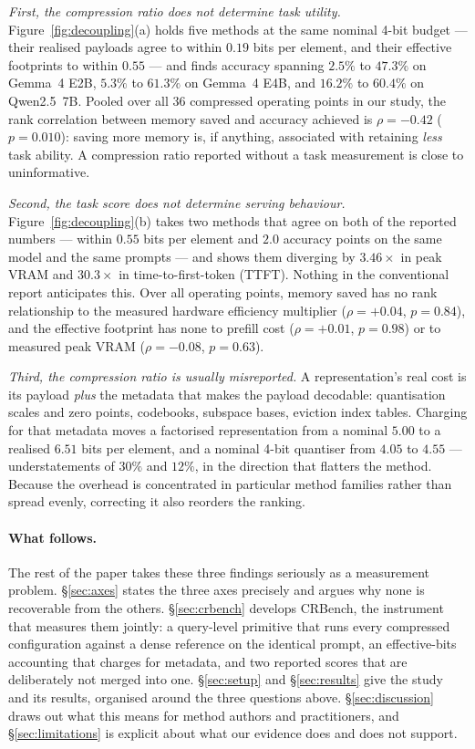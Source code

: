 \documentclass{article}
\theoremstyle{definition}
\begin{document}
\emph{First, the compression ratio does not determine task utility.} Figure~\ref{fig:decoupling}(a) holds five methods at the same nominal 4-bit budget --- their realised payloads agree to within $0.19$ bits per element, and their effective footprints to within $0.55$ --- and finds accuracy spanning $2.5\%$ to $47.3\%$ on Gemma~4 E2B, $5.3\%$ to $61.3\%$ on Gemma~4 E4B, and $16.2\%$ to $60.4\%$ on Qwen2.5~7B. Pooled over all 36 compressed operating points in our study, the rank correlation between memory saved and accuracy achieved is $\rho = {-}0.42$ ($p = 0.010$): saving more memory is, if anything, associated with retaining \emph{less} task ability. A compression ratio reported without a task measurement is close to uninformative.

\emph{Second, the task score does not determine serving behaviour.} Figure~\ref{fig:decoupling}(b) takes two methods that agree on both of the reported numbers --- within $0.55$ bits per element and $2.0$ accuracy points on the same model and the same prompts --- and shows them diverging by $3.46\times$ in peak VRAM and $30.3\times$ in time-to-first-token (TTFT). Nothing in the conventional report anticipates this. Over all operating points, memory saved has no rank relationship to the measured hardware efficiency multiplier ($\rho = {+}0.04$, $p = 0.84$), and the effective footprint has none to prefill cost ($\rho = {+}0.01$, $p = 0.98$) or to measured peak VRAM ($\rho = {-}0.08$, $p = 0.63$).

\emph{Third, the compression ratio is usually misreported.} A representation's real cost is its payload \emph{plus} the metadata that makes the payload decodable: quantisation scales and zero points, codebooks, subspace bases, eviction index tables. Charging for that metadata moves a factorised representation from a nominal $5.00$ to a realised $6.51$ bits per element, and a nominal 4-bit quantiser from $4.05$ to $4.55$ --- understatements of $30\%$ and $12\%$, in the direction that flatters the method. Because the overhead is concentrated in particular method families rather than spread evenly, correcting it also reorders the ranking.

\paragraph{What follows.}
The rest of the paper takes these three findings seriously as a measurement problem. \S\ref{sec:axes} states the three axes precisely and argues why none is recoverable from the others. \S\ref{sec:crbench} develops CRBench, the instrument that measures them jointly: a query-level primitive that runs every compressed configuration against a dense reference on the identical prompt, an effective-bits accounting that charges for metadata, and two reported scores that are deliberately not merged into one. \S\ref{sec:setup} and \S\ref{sec:results} give the study and its results, organised around the three questions above. \S\ref{sec:discussion} draws out what this means for method authors and practitioners, and \S\ref{sec:limitations} is explicit about what our evidence does and does not support.
\end{document}
